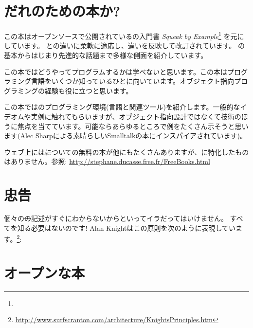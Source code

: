 \documentclass[a4paper,10pt,twoside]{book}
\begin{document}
\section*{だれのための本か?}

この本はオープンソースで公開されている\squeak の入門書 \emph{Squeak by Example}\footnote{\sbe} を元にしています。
\pharo と\squeak の違いに柔軟に適応し、違いを反映して改訂されています。
\pharo の基本からはじまり先進的な話題まで多様な側面を紹介しています。

この本ではどうやってプログラムするかは学べないと思います。この本はプログラミング言語をいくつか知っているひとに向いています。オブジェクト指向プログラミングの経験も役に立つと思います。

この本では\pharo のプログラミング環境(言語と関連ツール)を紹介します。一般的なイデオムや実例に触れてもらいますが、オブジェクト指向設計ではなくて技術のほうに焦点を当てています。可能ならあらゆるところで例をたくさん示そうと思います(Alec Sharpによる素晴らしいSmalltalkの本\cite{Shar97a}にインスパイアされています)。

ウェブ上には\st についての無料の本が他にもたくさんありますが、\pharo に特化したものはありません。参照:
\url{http://stephane.ducasse.free.fr/FreeBooks.html}

\ifluluelse{}{\newpage} %
\section*{忠告}


個々の\st の記述がすぐにわからないからといってイラだってはいけません。
すべてを知る必要はないのです!
Alan Knightはこの原則を次のように表現しています。\footnote{\url{http://www.surfscranton.com/architecture/KnightsPrinciples.htm}}:

\section*{オープンな本}
\end{document}
